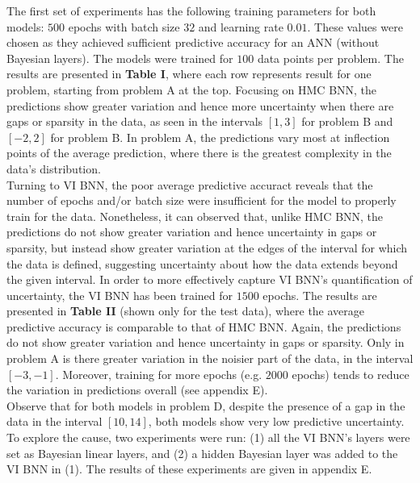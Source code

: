\documentclass[conference]{IEEEtran}
\begin{document}
The first set of experiments has the following training parameters for both models: $500$ epochs with batch size $32$ and learning rate $0.01$. These values were chosen as they achieved sufficient predictive accuracy for an ANN (without Bayesian layers). The models were trained for $100$ data points per problem. The results are presented in \textbf{Table I}, where each row represents result for one problem, starting from problem A at the top. Focusing on HMC BNN, the predictions show greater variation and hence more uncertainty when there are gaps or sparsity in the data, as seen in the intervals $[1, 3]$ for problem B and $[-2, 2]$ for problem B. In problem A, the predictions vary most at inflection points of the average prediction, where there is the greatest complexity in the data's distribution.\\

Turning to VI BNN, the poor average predictive accuract reveals that the number of epochs and/or batch size were insufficient for the model to properly train for the data. Nonetheless, it can observed that, unlike HMC BNN, the predictions do not show greater variation and hence uncertainty in gaps or sparsity, but instead show greater variation at the edges of the interval for which the data is defined, suggesting uncertainty about how the data extends beyond the given interval. In order to more effectively capture VI BNN's quantification of uncertainty, the VI BNN has been trained for $1500$ epochs. The results are presented in \textbf{Table II} (shown only for the test data), where the average predictive accuracy is comparable to that of HMC BNN. Again, the predictions do not show greater variation and hence uncertainty in gaps or sparsity. Only in problem A is there greater variation in the noisier part of the data, in the interval $[-3, -1]$. Moreover, training for more epochs (e.g. $2000$ epochs) tends to reduce the variation in predictions overall (see appendix E).\\

Observe that for both models in problem D, despite the presence of a gap in the data in the interval $[10, 14]$, both models show very low predictive uncertainty. To explore the cause, two experiments were run: (1) all the VI BNN's layers were set as Bayesian linear layers, and (2) a hidden Bayesian layer was added to the VI BNN in (1). The results of these experiments are given in appendix E.\\
\end{document}
